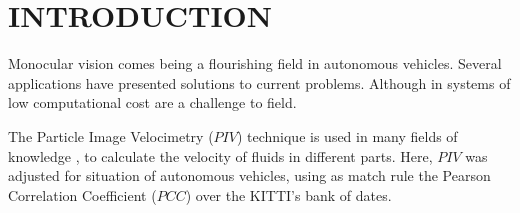 \section{INTRODUCTION}

Monocular vision comes being a flourishing field in autonomous vehicles. 
Several applications have presented solutions to current problems. 
Although in systems  of low computational cost  are a challenge to field. 


The Particle Image Velocimetry ($PIV$)\cite{Bastiaans} technique is used in many fields of 
knowledge \cite{Story, Xu}, to calculate the velocity of fluids in different parts. 
Here, $PIV$ was adjusted for situation of autonomous vehicles, using as match rule 
the Pearson Correlation Coefficient ($PCC$)\cite{Miranda Neto} over the KITTI's 
bank of dates\cite{Geiger}.


